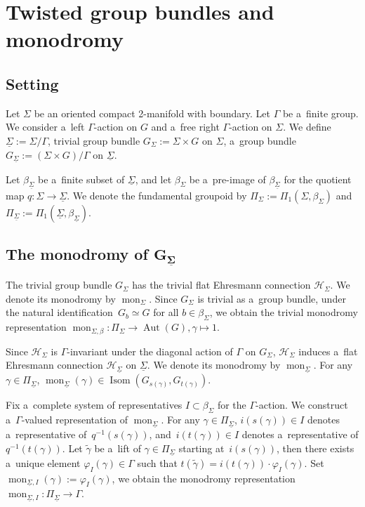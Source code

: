 \documentclass[10pt,a4paper]{amsart}
\numberwithin{equation}{section}
\theoremstyle{definition}
\newcommand{\Aut}{\operatorname{Aut}}
\newcommand{\Isom}{\operatorname{Isom}}
\newcommand{\mon}{\operatorname{mon}}
\begin{document}
\section{Twisted group bundles and monodromy}\label{Appendix B}

\subsection{Setting}

Let $\Sigma$ be an oriented compact 2-manifold with boundary.
Let $\Gamma$ be a~finite group.
We consider a~left $\Gamma$-action on $G$ and a~free right $\Gamma$-action on $\Sigma$.
We define
 $ \underline{\Sigma} := \Sigma/\Gamma$,
 trivial group bundle $G_{\Sigma} := \Sigma \times G$ on $\Sigma$,
a~group bundle $G_{\underline{\Sigma}}:= (\Sigma \times G)/\Gamma$ on $\underline{\Sigma}$.

Let $\beta_{\underline{\Sigma}} $ be a~finite subset of $\underline{\Sigma}$, and let $\beta_{\Sigma}$ be a~pre-image of $\beta_{\underline{\Sigma}}$ for the quotient map $q \colon \Sigma \to \underline{\Sigma}$.
We denote the fundamental groupoid by $\Pi_{\Sigma} := \Pi_1(\Sigma,\beta_{\Sigma})$ and $\Pi_{\underline{\Sigma}} := \Pi_1(\underline{\Sigma},\beta_{\underline{\Sigma}})$.

\subsection[The monodromy of G\_Sigma]{The monodromy of $\boldsymbol{G_{\underline{\Sigma}}}$}
The trivial group bundle $G_{\Sigma}$ has the trivial flat Ehresmann connection $\mathcal{H}_{\Sigma}$. We denote its monodromy by $\mon_{\Sigma}$.
Since $G_{\Sigma}$ is trivial as a~group bundle, under the natural identification~${G_b \simeq G}$ for all $b \in \beta_{\Sigma}$, we obtain the trivial monodromy representation
$
\mon_{\Sigma, \beta} \colon\Pi_{\Sigma} \to \Aut(G), \gamma \mapsto 1$.

Since $\mathcal{H}_{\Sigma}$ is $\Gamma$-invariant under the diagonal action of $\Gamma$ on $G_{\Sigma}$, $\mathcal{H}_{\Sigma}$ induces a~flat Ehresmann connection $\mathcal{H}_{\underline{\Sigma}}$ on $\underline{\Sigma}$.
We denote its monodromy by $\mon_{\underline{\Sigma}}$.
For any $\gamma \in \Pi_{\underline{\Sigma}}$, $\mon_{\underline{\Sigma}}(\gamma) \in \Isom(G_{s(\gamma)},G_{t(\gamma)})$.

Fix a~complete system of representatives $I \subset \beta_{\Sigma}$ for the $\Gamma$-action.
We construct a~$\Gamma$-valued representation of $\mon_{\underline{\Sigma}}$.
For any $\gamma \in \Pi_{\underline{\Sigma}}$, $i(s(\gamma)) \in I$ denotes a~representative of~$q^{-1}(s(\gamma))$, and~${i(t(\gamma)) \in I}$ denotes a~representative of $q^{-1}(t(\gamma))$.
Let $\tilde{\gamma}$ be a~lift of $\gamma \in \Pi_{\underline{\Sigma}}$ starting at~$i(s(\gamma))$,
then there exists a~unique element $\varphi_I(\gamma) \in \Gamma$ such that
$t(\tilde{\gamma}) = i(t(\gamma))\cdot \varphi_I(\gamma)$.
Set ${\mon_{\underline{\Sigma},I}(\gamma) := \varphi_I(\gamma)}$,
we obtain the monodromy representation $\mon_{\underline{\Sigma},I} \colon \Pi_{\underline{\Sigma}} \to \Gamma$.
\end{document}
